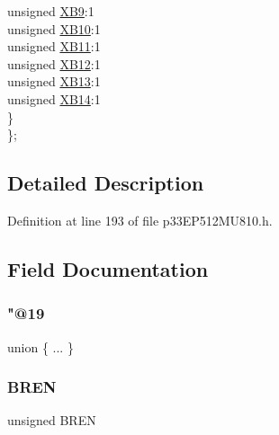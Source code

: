 \begin{DoxyCompactItemize}
\begin{tabbing}
\>\>unsigned \hyperlink{structtag_x_b_r_e_v_b_i_t_s_ab49c34475ac53d237bf37f2ee50039d4}{XB9}:1\\
\>\>unsigned \hyperlink{structtag_x_b_r_e_v_b_i_t_s_a9ecaab8db5f6d71bbd849272c16fcc2b}{XB10}:1\\
\>\>unsigned \hyperlink{structtag_x_b_r_e_v_b_i_t_s_a9d0784ed33e46ac5a785c31d3e09d8ef}{XB11}:1\\
\>\>unsigned \hyperlink{structtag_x_b_r_e_v_b_i_t_s_af8e3e577b3ca527fa7e26644defe926d}{XB12}:1\\
\>\>unsigned \hyperlink{structtag_x_b_r_e_v_b_i_t_s_a697217bea084ab3cbb156251d62ef7fa}{XB13}:1\\
\>\>unsigned \hyperlink{structtag_x_b_r_e_v_b_i_t_s_ae04941803661c40da32f41cc7128c7b1}{XB14}:1\\
\>\} \\
\}; \\

\end{tabbing}\end{DoxyCompactItemize}


\subsection{Detailed Description}


Definition at line 193 of file p33\+E\+P512\+M\+U810.\+h.



\subsection{Field Documentation}
\mbox{\label{structtag_x_b_r_e_v_b_i_t_s_aa5a705866abf7ed99293d1799be09813}} 
\subsubsection{\texorpdfstring{"@19}{@19}}
{\footnotesize\ttfamily union \{ ... \} }

\mbox{\label{structtag_x_b_r_e_v_b_i_t_s_acd7eac8da0f3c4bd53f634c978510b63}} 
\subsubsection{\texorpdfstring{B\+R\+EN}{BREN}}
{\footnotesize\ttfamily unsigned B\+R\+EN}



